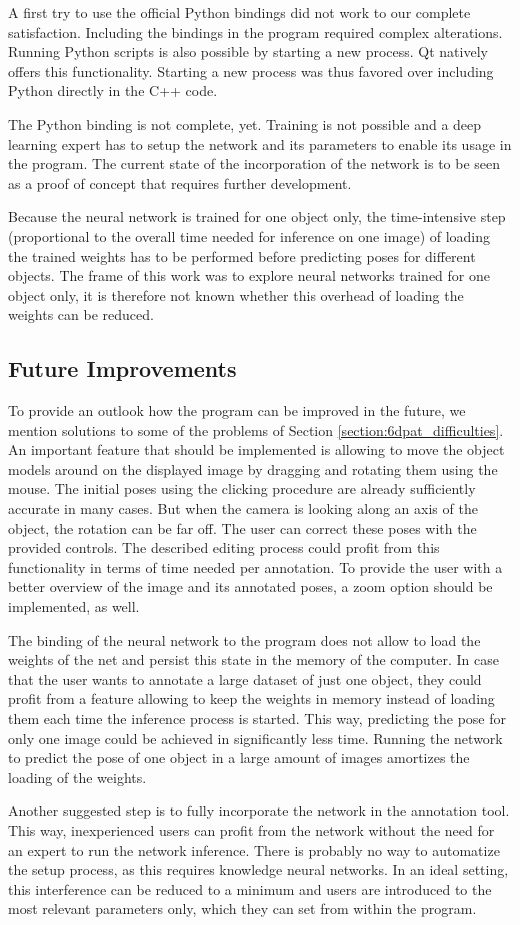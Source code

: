 A first try to use the official Python bindings did not work to our complete satisfaction. Including the bindings in the program required complex alterations. Running Python scripts is also possible by starting a new process. Qt natively offers this functionality. Starting a new process was thus favored over including Python directly in the C++ code.

The Python binding is not complete, yet. Training is not possible and a deep learning expert has to setup the network and its parameters to enable its usage in the program. The current state of the incorporation of the network is to be seen as a proof of concept that requires further development.

Because the neural network is trained for one object only, the time-intensive step (proportional to the overall time needed for inference on one image) of loading the trained weights has to be performed before predicting poses for different objects. The frame of this work was to explore neural networks trained for one object only, it is therefore not known whether this overhead of loading the weights can be reduced.

\subsection{Future Improvements}

To provide an outlook how the program can be improved in the future, we mention solutions to some of the problems of Section \ref{section:6dpat_difficulties}. An important feature that should be implemented is allowing to move the object models around on the displayed image by dragging and rotating them using the mouse. The initial poses using the clicking procedure are already sufficiently accurate in many cases. But when the camera is looking along an axis of the object, the rotation can be far off. The user can correct these poses with the provided controls. The described editing process could profit from this functionality in terms of time needed per annotation. To provide the user with a better overview of the image and its annotated poses, a zoom option should be implemented, as well.

The binding of the neural network to the program does not allow to load the weights of the net and persist this state in the memory of the computer. In case that the user wants to annotate a large dataset of just one object, they could profit from a feature allowing to keep the weights in memory instead of loading them each time the inference process is started. This way, predicting the pose for only one image could be achieved in significantly less time. Running the network to predict the pose of one object in a large amount of images amortizes the loading of the weights.

Another suggested step is to fully incorporate the network in the annotation tool. This way, inexperienced users can profit from the network without the need for an expert to run the network inference. There is probably no way to automatize the setup process, as this requires knowledge neural networks. In an ideal setting, this interference can be reduced to a minimum and users are introduced to the most relevant parameters only, which they can set from within the program.